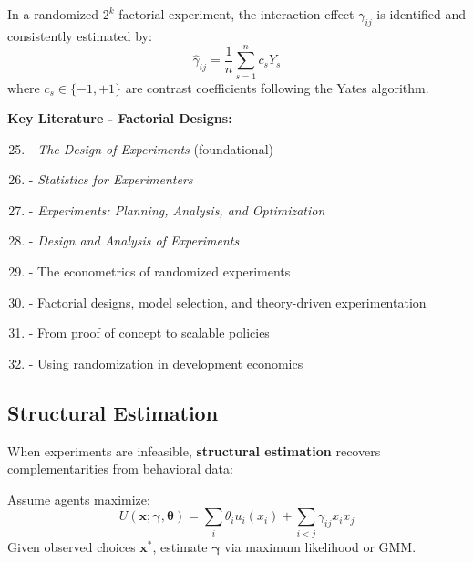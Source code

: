 \begin{theorem}
In a randomized $2^k$ factorial experiment, the interaction effect $\gamma_{ij}$ is identified and consistently estimated by:
\begin{equation}
\hat{\gamma}_{ij} = \frac{1}{n} \sum_{s=1}^{n} c_s Y_s
\end{equation}
where $c_s \in \{-1, +1\}$ are contrast coefficients following the Yates algorithm.
\end{theorem}

\textbf{Key Literature - Factorial Designs:}
\begin{enumerate}[noitemsep]
    \setcounter{enumi}{24}
    \item \citet{fisher1935} - \textit{The Design of Experiments} (foundational)
    \item \citet{box1978} - \textit{Statistics for Experimenters}
    \item \citet{wu2009} - \textit{Experiments: Planning, Analysis, and Optimization}
    \item \citet{montgomery2017} - \textit{Design and Analysis of Experiments}
    \item \citet{athey2017} - The econometrics of randomized experiments
    \item \citet{muralidharan2017} - Factorial designs, model selection, and theory-driven experimentation
    \item \citet{banerjee2017} - From proof of concept to scalable policies
    \item \citet{duflo2007} - Using randomization in development economics
\end{enumerate}

\subsection{Structural Estimation}
\label{subsec:structural-estimation}

When experiments are infeasible, \textbf{structural estimation} recovers complementarities from behavioral data:

\begin{definition}
Assume agents maximize:
\begin{equation}
U(\mathbf{x}; \boldsymbol{\gamma}, \boldsymbol{\theta}) = \sum_i \theta_i u_i(x_i) + \sum_{i < j} \gamma_{ij} x_i x_j
\end{equation}
Given observed choices $\mathbf{x}^*$, estimate $\boldsymbol{\gamma}$ via maximum likelihood or GMM.
\end{definition}

